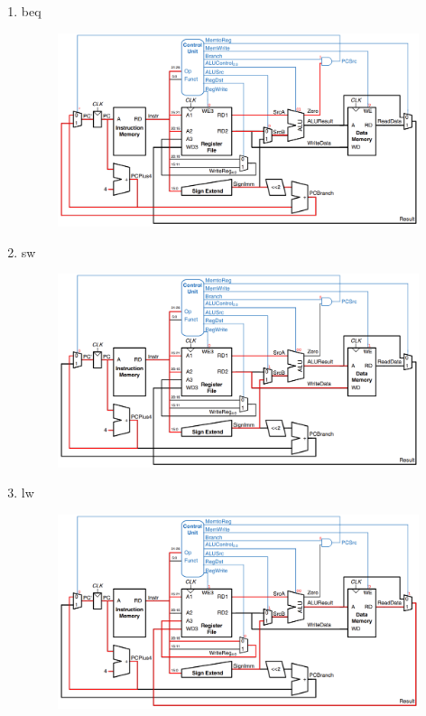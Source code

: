 \documentclass{article}
\begin{document}
\begin{enumerate}
    \item beq\\

\begin{figure}[H]
    \centering
    \includegraphics[width=1\linewidth]{beq.png}
\end{figure}

    \item sw\\

\begin{figure}[H]
    \centering
    \includegraphics[width=1\linewidth]{sw.png}
\end{figure}

    \item lw\\

\begin{figure}[H]
    \centering
    \includegraphics[width=1\linewidth]{lw.png}
\end{figure}


\end{enumerate}
\end{document}
